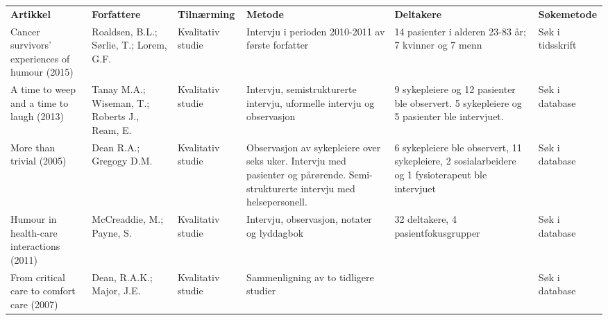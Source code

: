 \begin{table}
  \begin{tabularx}{\textwidth}{XXXXXX}
    \textbf{Artikkel} &
    \textbf{Forfattere} &
    \textbf{Tilnærming} &
    \textbf{Metode} &
    \textbf{Deltakere} &
    \textbf{Søkemetode} \\
    Cancer survivors’ experiences of humour (2015) &
    Roaldsen, B.L.; S{\o}rlie, T.; Lorem, G.F. &
    Kvalitativ studie &
    Intervju i perioden 2010-2011 av første forfatter &
    14 pasienter i alderen 23-83 år; 7 kvinner og 7 menn &
    Søk i tidsskrift
    \\
    A time to weep and a time to laugh (2013) &
    Tanay M.A.; Wiseman, T.; Roberts J., Ream, E. &
    Kvalitativ studie &
    Intervju, semistrukturerte intervju, uformelle intervju og observasjon &
    9 sykepleiere og 12 pasienter ble observert. 5 sykepleiere og 5 pasienter ble intervjuet. &
    Søk i database
    \\
    More than trivial (2005) &
    Dean R.A.; Gregogy D.M. &
    Kvalitativ studie &
    Observasjon av sykepleiere over seks uker. Intervju med
    pasienter og pårørende. Semi-strukturerte intervju med helsepersonell. &
    6 sykepleiere ble observert, 11 sykepleiere, 2
    sosialarbeidere og 1 fysioterapeut ble intervjuet &
    Søk i database
    \\
    Humour in health-care interactions (2011) &
    McCreaddie, M.; Payne, S. &
    Kvalitativ studie &
    Intervju, observasjon, notater og lyddagbok &
    32 deltakere, 4 pasientfokusgrupper &
    Søk i database
    \\
    From critical care to comfort care (2007) &
    Dean, R.A.K.; Major, J.E. &
    Kvalitativ studie &
    Sammenligning av to tidligere studier &
    &
    Søk i database
  \end{tabularx}
\end{table}
